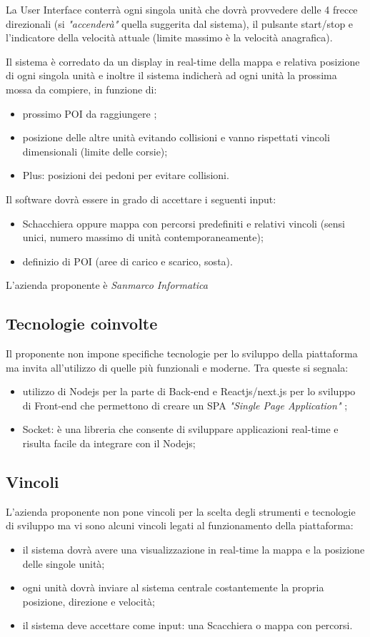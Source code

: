 La User Interface conterrà ogni singola unità  che dovrà provvedere delle 4 frecce direzionali (si \textit{"accenderà"} quella suggerita dal sistema), il pulsante start/stop e l'indicatore della velocità attuale (limite massimo è  la velocità anagrafica).

Il sistema è corredato da un display in real-time della mappa e relativa posizione di ogni singola unità e inoltre il sistema indicherà ad ogni unità la prossima mossa da compiere, in funzione di: 
\begin{itemize}
\item prossimo POI da raggiungere ;
\item posizione delle altre unità evitando collisioni e vanno rispettati vincoli dimensionali (limite delle corsie);
\item Plus: posizioni dei pedoni per evitare collisioni.
\end{itemize}
Il software dovrà essere in grado di accettare i seguenti input:\begin{itemize}
\item Schacchiera oppure mappa con percorsi predefiniti e relativi vincoli (sensi unici, numero massimo di unità contemporaneamente);
\item definizio di POI (aree di carico e scarico, sosta).
\end{itemize}
L'azienda proponente è \textit{Sanmarco Informatica}

\subsection{Tecnologie coinvolte}
Il proponente non impone specifiche tecnologie per lo sviluppo della piattaforma ma invita all'utilizzo di quelle più funzionali e moderne.
Tra queste si segnala: 
\begin{itemize}
\item utilizzo di Nodejs per la parte di Back-end e Reactjs/next.js  per lo sviluppo di Front-end che permettono di creare un SPA \textit{"Single Page Application"} ;
\item Socket: è una libreria che consente di sviluppare applicazioni real-time e risulta facile da integrare con il Nodejs;
\end{itemize}

\subsection{Vincoli}
L'azienda proponente non pone vincoli per la scelta degli strumenti e tecnologie di sviluppo ma vi sono alcuni vincoli legati al funzionamento della piattaforma: 
\begin{itemize}
\item il sistema dovrà avere una visualizzazione in real-time la mappa e la posizione delle singole unità;
\item ogni unità dovrà inviare al sistema centrale costantemente la propria posizione, direzione e velocità;
\item il sistema deve accettare come input: una Scacchiera o mappa con percorsi.
\end{itemize}


